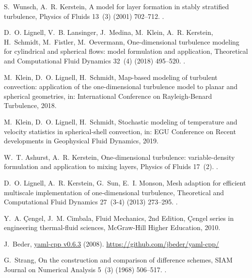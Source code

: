 \documentclass[preprint,12pt, a4paper]{elsarticle}
\begin{document}
\begin{thebibliography}{10}
S.~Wunsch, A.~R. Kerstein, A model for layer formation in stably stratified
  turbulence, Physics of Fluids 13~(3) (2001) 702--712.
\newblock \href {http://dx.doi.org/10.1063/1.1344182}
  {}.

D.~O. Lignell, V.~B. Lansinger, J.~Medina, M.~Klein, A.~R. Kerstein,
  H.~Schmidt, M.~Fistler, M.~Oevermann, One-dimensional turbulence modeling for
  cylindrical and spherical flows: model formulation and application,
  Theoretical and Computational Fluid Dynamics 32~(4) (2018) 495--520.
\newblock \href {http://dx.doi.org/10.1007/s00162-018-0465-1}
  {}.

M.~Klein, D.~O. Lignell, H.~Schmidt, Map-based modeling of turbulent
  convection: application of the one-dimensional turbulence model to planar and
  spherical geometries, in: International Conference on Rayleigh-Benard
  Turbulence, 2018.

M.~Klein, D.~O. Lignell, H.~Schmidt, Stochastic modeling of temperature and
  velocity statistics in spherical-shell convection, in: EGU Conference on
  Recent developments in Geophysical Fluid Dynamics, 2019.

W.~T. Ashurst, A.~R. Kerstein, One-dimensional turbulence: variable-density
  formulation and application to mixing layers, Physics of Fluids 17~(2).
\newblock \href {http://dx.doi.org/10.1063/1.1847413}
  {}.

D.~O. Lignell, A.~R. Kerstein, G.~Sun, E.~I. Monson, Mesh adaption for
  efficient multiscale implementation of one-dimensional turbulence,
  Theoretical and Computational Fluid Dynamics 27~(3-4) (2013) 273--295.
\newblock \href {http://dx.doi.org/10.1007/s00162-012-0267-9}
  {}.

Y.~A. {\c{C}}engel, J.~M. Cimbala, Fluid Mechanics, 2nd Edition, {\c{C}}engel
  series in engineering thermal-fluid sciences, {McGraw-Hill Higher Education},
  2010.

J.~Beder, \href{https://github.com/jbeder/yaml-cpp/}{yaml-cpp v0.6.3} (2008).
\newline\urlprefix\url{https://github.com/jbeder/yaml-cpp/}

G.~Strang, On the construction and comparison of difference schemes, SIAM
  Journal on Numerical Analysis 5~(3) (1968) 506--517.
\newblock \href {http://dx.doi.org/10.1137/0705041}
  {}.


\end{thebibliography}
\end{document}
